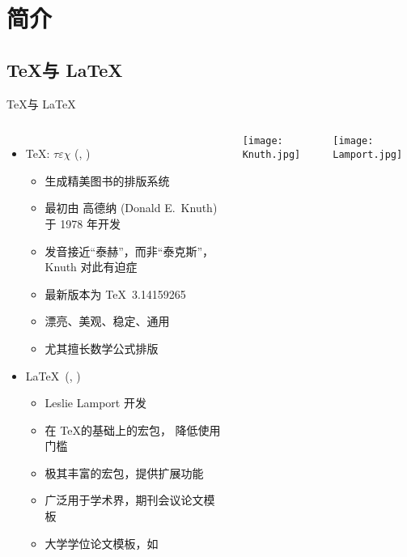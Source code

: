 \section{简介}

\subsection{\TeX 与 \LaTeX}

\begin{frame}[fragile]{\TeX 与 \LaTeX}
  \begin{columns}[T]
    \begin{itemize}
      \item \TeX: $\tau\varepsilon\chi$ (,
        )
        \begin{itemize}
          \item 生成精美图书的排版系统
          \item 最初由 高德纳 (Donald E.~Knuth) 于 1978 年开发
          \item 发音接近``泰赫''，而非``泰克斯''，
            Knuth 对此有迫症
          \item 最新版本为 \TeX\ 3.14159265
          \item 漂亮、美观、稳定、通用
          \item 尤其擅长数学公式排版
        \end{itemize}
      \item \LaTeX\ (, )
        \begin{itemize}
          \item Leslie Lamport 开发
          \item 在 \TeX 的基础上的宏包， 降低使用门槛
          \item 极其丰富的宏包，提供扩展功能
          \item 广泛用于学术界，期刊会议论文模板
          \item 大学学位论文模板，如 \ThuThesis
        \end{itemize}
    \end{itemize}
    \texttt{[image: Knuth.jpg]}

    \texttt{[image: Lamport.jpg]}

  \end{columns}
\end{frame}

